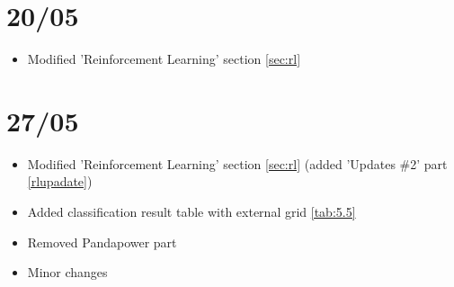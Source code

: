 \section{20/05}
\begin{itemize}
    \item Modified 'Reinforcement Learning' section \ref{sec:rl}
\end{itemize}

\section{27/05}
\begin{itemize}
    \item Modified 'Reinforcement Learning' section \ref{sec:rl} (added 'Updates \#2' part \ref{rlupadate})
    \item Added classification result table with external grid \ref{tab:5.5}
    \item Removed Pandapower part
    \item Minor changes
\end{itemize}
